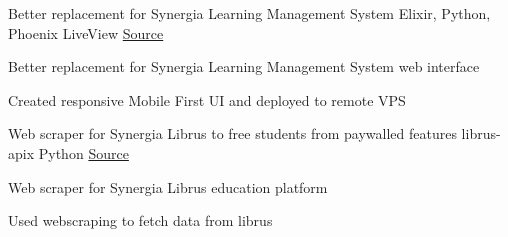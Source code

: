 \begin{cventries}
  \cventry
    {Better replacement for Synergia Learning Management System} %
    {} %
    {Elixir, Python, Phoenix LiveView} %
    {\href{https://github.com/rustysnek/elixirus}{\faGithubSquare\acvHeaderIconSep Source}} %
    {
      \begin{cvitems} %
        \item {Better replacement for Synergia Learning Management System web interface}
        \item {Created responsive Mobile First UI and deployed to remote VPS}
      \end{cvitems}
    } %
    \vspace{7mm}
  \cventry
    {Web scraper for Synergia Librus to free students from paywalled features} %
    {librus-apix} %
    {Python} %
    {\href{https://github.com/rustysnek/librus-apix}{\faGithubSquare\acvHeaderIconSep Source}} %
    {
      \begin{cvitems} %
        \item {Web scraper for Synergia Librus education platform}
        \item {Used webscraping to fetch data from librus}
      \end{cvitems}
    } %

\end{cventries}
